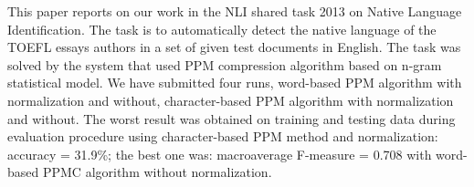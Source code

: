 This paper reports on our work in the NLI shared task 2013 on Native Language Identification. The task is to automatically detect the native language of the
 TOEFL essays authors in a set of given test documents in English. The task
 was solved by the system that used PPM compression algorithm based on n-gram
 statistical model. We have submitted four runs, word-based PPM algorithm with
 normalization and without, character-based PPM algorithm with normalization
 and without. The worst result was obtained on training and testing data during
 evaluation procedure using character-based PPM method and normalization:
 accuracy = 31.9\%; the best one was: macroaverage F-measure = 0.708 with
 word-based PPMC algorithm without normalization.

